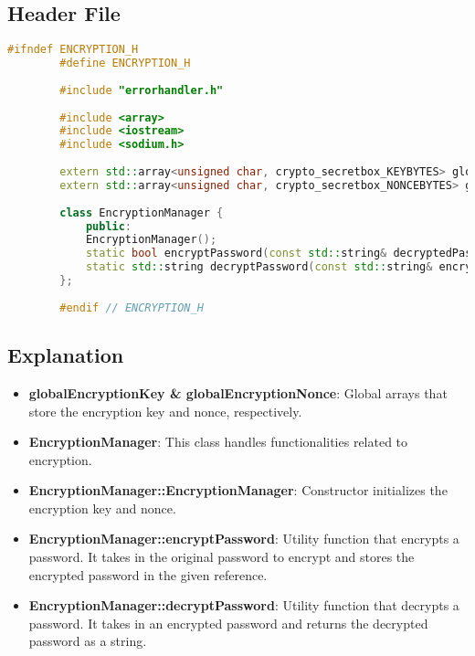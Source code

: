 \documentclass{article}
\begin{document}
	\subsection*{Header File}
	\begin{mdframed}[backgroundcolor=background, hidealllines=false, innerleftmargin=15pt, innerrightmargin=5pt, innertopmargin=0pt, innerbottommargin=-5pt, linecolor=accent]
	\begin{lstlisting}[language=C++]
		#ifndef ENCRYPTION_H
		#define ENCRYPTION_H
		
		#include "errorhandler.h"
		
		#include <array>
		#include <iostream>
		#include <sodium.h>
		
		extern std::array<unsigned char, crypto_secretbox_KEYBYTES> globalEncryptionKey;
		extern std::array<unsigned char, crypto_secretbox_NONCEBYTES> globalEncryptionNonce;
		
		class EncryptionManager {
			public:
			EncryptionManager();
			static bool encryptPassword(const std::string& decryptedPassword, std::string& encryptedPassword);
			static std::string decryptPassword(const std::string& encryptedPassword);
		};
		
		#endif // ENCRYPTION_H
	\end{lstlisting}
	\end{mdframed}
	
	\subsection*{Explanation}
	\begin{itemize}
		\item \textbf{globalEncryptionKey \& globalEncryptionNonce}: Global arrays that store the encryption key and nonce, respectively.
		\item \textbf{EncryptionManager}: This class handles functionalities related to encryption.
		\item \textbf{EncryptionManager::EncryptionManager}: Constructor initializes the encryption key and nonce.
		\item \textbf{EncryptionManager::encryptPassword}: Utility function that encrypts a password. It takes in the original password to encrypt and stores the encrypted password in the given reference.
		\item \textbf{EncryptionManager::decryptPassword}: Utility function that decrypts a password. It takes in an encrypted password and returns the decrypted password as a string.
	\end{itemize}
	
\end{document}
